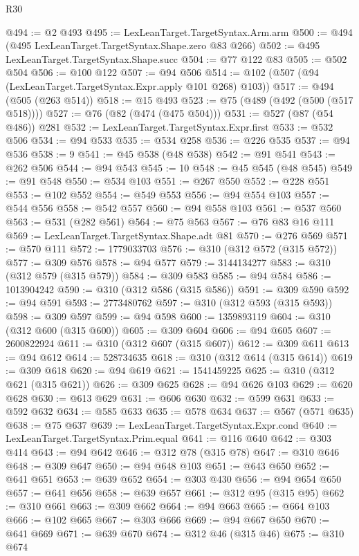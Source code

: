 \begin{lexlean}{R30}
\begin{coremodule}
@494 := @2 @493
@495 := LexLeanTarget.TargetSyntax.Arm.arm
@500 := @494 (@495 LexLeanTarget.TargetSyntax.Shape.zero @83 @266)
@502 := @495 LexLeanTarget.TargetSyntax.Shape.succ
@504 := @77 @122 @83
@505 := @502 @504
@506 := @100 @122
@507 := @94 @506
@514 := @102 (@507 (@94 (LexLeanTarget.TargetSyntax.Expr.apply @101 @268) @103))
@517 := @494 (@505 (@263 @514))
@518 := @15 @493
@523 := @75 (@489 (@492 (@500 (@517 @518))))
@527 := @76 (@82 (@474 (@475 @504)))
@531 := @527 (@87 (@54 @486)) @281
@532 := LexLeanTarget.TargetSyntax.Expr.first
@533 := @532 @506
@534 := @94 @533
@535 := @534 @258
@536 := @226 @535
@537 := @94 @536
@538 := 9
@541 := @45 @538 (@48 @538)
@542 := @91 @541
@543 := @262 @506
@544 := @94 @543
@545 := 10
@548 := @45 @545 (@48 @545)
@549 := @91 @548
@550 := @534 @103
@551 := @267 @550
@552 := @228 @551
@553 := @102 @552
@554 := @549 @553
@556 := @94 @554 @103
@557 := @544 @556
@558 := @542 @557
@560 := @94 @558 @103
@561 := @537 @560
@563 := @531 (@282 @561)
@564 := @75 @563
@567 := @76 @83 @16 @111
@569 := LexLeanTarget.TargetSyntax.Shape.adt @81
@570 := @276 @569
@571 := @570 @111
@572 := 1779033703
@576 := @310 (@312 @572 (@315 @572))
@577 := @309 @576
@578 := @94 @577
@579 := 3144134277
@583 := @310 (@312 @579 (@315 @579))
@584 := @309 @583
@585 := @94 @584
@586 := 1013904242
@590 := @310 (@312 @586 (@315 @586))
@591 := @309 @590
@592 := @94 @591
@593 := 2773480762
@597 := @310 (@312 @593 (@315 @593))
@598 := @309 @597
@599 := @94 @598
@600 := 1359893119
@604 := @310 (@312 @600 (@315 @600))
@605 := @309 @604
@606 := @94 @605
@607 := 2600822924
@611 := @310 (@312 @607 (@315 @607))
@612 := @309 @611
@613 := @94 @612
@614 := 528734635
@618 := @310 (@312 @614 (@315 @614))
@619 := @309 @618
@620 := @94 @619
@621 := 1541459225
@625 := @310 (@312 @621 (@315 @621))
@626 := @309 @625
@628 := @94 @626 @103
@629 := @620 @628
@630 := @613 @629
@631 := @606 @630
@632 := @599 @631
@633 := @592 @632
@634 := @585 @633
@635 := @578 @634
@637 := @567 (@571 @635)
@638 := @75 @637
@639 := LexLeanTarget.TargetSyntax.Expr.cond
@640 := LexLeanTarget.TargetSyntax.Prim.equal
@641 := @116 @640
@642 := @303 @414
@643 := @94 @642
@646 := @312 @78 (@315 @78)
@647 := @310 @646
@648 := @309 @647
@650 := @94 @648 @103
@651 := @643 @650
@652 := @641 @651
@653 := @639 @652
@654 := @303 @430
@656 := @94 @654 @650
@657 := @641 @656
@658 := @639 @657
@661 := @312 @95 (@315 @95)
@662 := @310 @661
@663 := @309 @662
@664 := @94 @663
@665 := @664 @103
@666 := @102 @665
@667 := @303 @666
@669 := @94 @667 @650
@670 := @641 @669
@671 := @639 @670
@674 := @312 @46 (@315 @46)
@675 := @310 @674

\end{coremodule}
\end{lexlean}
